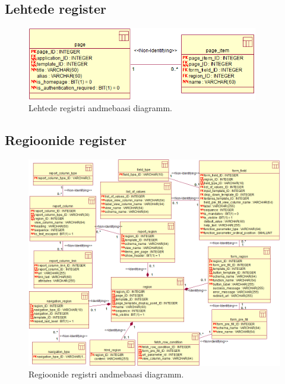 \documentclass[a4paper,12pt]{article} %
\begin{document}
\subsection*{Lehtede register}
\begin{figure}[H]
\centering
\includegraphics[width=0.9\textwidth]{./diagrams/page-db-diagram.png}
\caption{Lehtede registri andmebaasi diagramm.}
\label{fig_lehtede_registri_andmebaasi_diagramm}
\end{figure}

\subsection*{Regioonide register}
\begin{figure}[H]
\centering
\includegraphics[width=\textwidth]{./diagrams/region-db-diagram.png}
\caption{Regioonide registri andmebaasi diagramm.}
\label{fig_regioonide_registri_andmebaasi_diagramm}
\end{figure}
\end{document}
